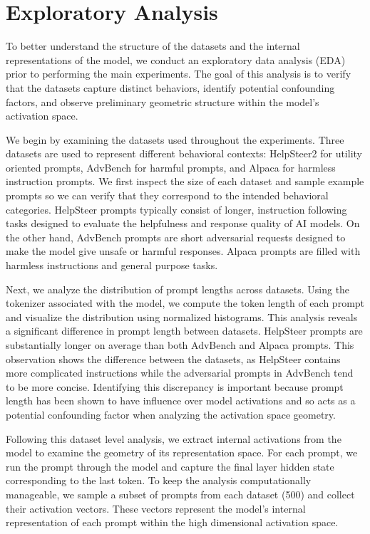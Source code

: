 \section{Exploratory Analysis}
To better understand the structure of the datasets and the internal representations of the model, we conduct an exploratory data analysis (EDA) prior to performing the main experiments. The goal of this analysis is to verify that the datasets capture distinct behaviors, identify potential confounding factors, and observe preliminary geometric structure within the model’s activation space.

We begin by examining the datasets used throughout the experiments. Three datasets are used to represent different behavioral contexts: HelpSteer2 for utility oriented prompts, AdvBench for harmful prompts, and Alpaca for harmless instruction prompts. We first inspect the size of each dataset and sample example prompts so we can verify that they correspond to the intended behavioral categories. HelpSteer prompts typically consist of longer, instruction following tasks designed to evaluate the helpfulness and response quality of AI models. On the other hand, AdvBench prompts are short adversarial requests designed to make the model give unsafe or harmful responses. Alpaca prompts are filled with harmless instructions and general purpose tasks.

Next, we analyze the distribution of prompt lengths across datasets. Using the tokenizer associated with the model, we compute the token length of each prompt and visualize the distribution using normalized histograms. This analysis reveals a significant difference in prompt length between datasets. HelpSteer prompts are substantially longer on average than both AdvBench and Alpaca prompts. This observation shows the difference between the datasets, as HelpSteer contains more complicated instructions while the adversarial prompts in AdvBench tend to be more concise. Identifying this discrepancy is important because prompt length has been shown to have influence over model activations and so acts as a potential confounding factor when analyzing the activation space geometry.

Following this dataset level analysis, we extract internal activations from the model to examine the geometry of its representation space. For each prompt, we run the prompt through the model and capture the final layer hidden state corresponding to the last token. To keep the analysis computationally manageable, we sample a subset of prompts from each dataset (500) and collect their activation vectors. These vectors represent the model’s internal representation of each prompt within the high dimensional activation space.

